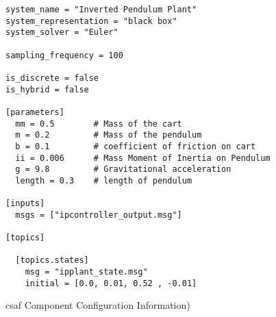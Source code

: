 \begin{figure}
\begin{lstlisting}
system_name = "Inverted Pendulum Plant"
system_representation = "black box"
system_solver = "Euler"

sampling_frequency = 100

is_discrete = false
is_hybrid = false

[parameters]
  mm = 0.5        # Mass of the cart
  m = 0.2         # Mass of the pendulum
  b = 0.1         # coefficient of friction on cart
  ii = 0.006      # Mass Moment of Inertia on Pendulum
  g = 9.8         # Gravitational acceleration
  length = 0.3    # length of pendulum

[inputs]
  msgs = ["ipcontroller_output.msg"]

[topics]

  [topics.states]
    msg = "ipplant_state.msg"
    initial = [0.0, 0.01, 0.52 , -0.01]
\end{lstlisting}
\caption{ \acrshort{csaf}  Component Configuration Information)}
\label{fig:cmsg}
\end{figure}

